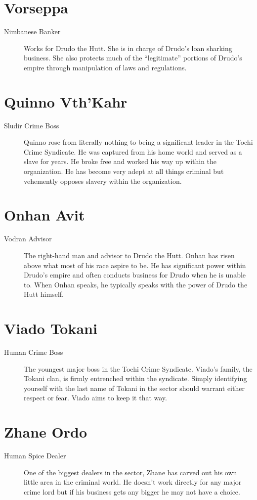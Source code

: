 \documentclass{article}
\begin{document}
\section{Vorseppa}
\begin{description}
	\item [Nimbanese \female Banker] Works for Drudo the Hutt. She is in charge of Drudo’s loan sharking business. She also protects much of the “legitimate” portions of Drudo’s empire through manipulation of laws and regulations.
\end{description}
\section{Quinno Vth’Kahr}
\begin{description}
	\item [Sludir \male Crime Boss] Quinno rose from literally nothing to being a significant leader in the Tochi Crime Syndicate. He was captured from his home world and served as a slave for years. He broke free and worked his way up within the organization. He has become very adept at all things criminal but vehemently opposes slavery within the organization.
\end{description}
\section{Onhan Avit}
\begin{description}
	\item [Vodran \male Advisor] The right-hand man and advisor to Drudo the Hutt. Onhan has risen above what most of his race aspire to be. He has significant power within Drudo’s empire and often conducts business for Drudo when he is unable to. When Onhan speaks, he typically speaks with the power of Drudo the Hutt himself.
\end{description}
\section{Viado Tokani}
\begin{description}
	\item [Human \male Crime Boss] The youngest major boss in the Tochi Crime Syndicate. Viado’s family, the Tokani clan, is firmly entrenched within the syndicate. Simply identifying yourself with the last name of Tokani in the sector should warrant either respect or fear. Viado aims to keep it that way.
\end{description}
\section{Zhane Ordo}
\begin{description}
	\item [Human \male Spice Dealer] One of the biggest dealers in the sector, Zhane has carved out his own little area in the criminal world. He doesn’t work directly for any major crime lord but if his business gets any bigger he may not have a choice.
\end{description}
\end{document}

